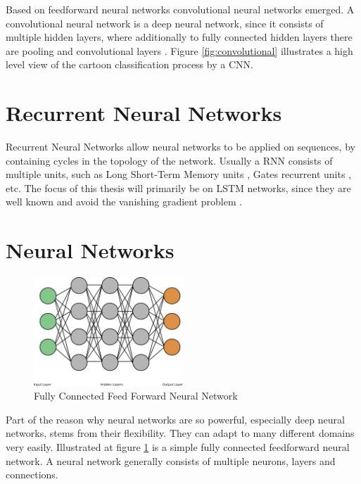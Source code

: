 \documentclass[draft,final,oneside]{vutinfth} %
\begin{document}
Based on feedforward neural networks convolutional neural networks emerged. A convolutional neural network is a deep neural network, since it consists of multiple hidden layers, where additionally to fully connected hidden layers there are pooling and convolutional layers \cite{Druzhkov2016}\cite{cnnnontech}. Figure \ref{fig:convolutional} illustrates a high level view of the cartoon classification process by a CNN.

\section{Recurrent Neural Networks}

Recurrent Neural Networks allow neural networks to be applied on sequences, by containing cycles in the topology of the network. Usually a RNN consists of multiple units, such as Long Short-Term Memory units \cite{hochreiter}, Gates recurrent units \cite{gru}, etc. The focus of this thesis will primarily be on LSTM networks, since they are well known and avoid the vanishing gradient problem \cite {vanishinggradient}.


\iffalse
\section{Neural Networks}

\begin{figure}[ht]
	\centering
  	\includegraphics[width=0.5\textwidth]{graphics/simple_neural_network.png}
	\caption{Fully Connected Feed Forward Neural Network}
	\label{fig:feedforward}
\end{figure}

Part of the reason why neural networks are so powerful, especially deep neural networks, stems from their flexibility. They can adapt to many different domains very easily. Illustrated at figure \ref{fig:feedforward} is a simple fully connected feedforward neural network. A neural network generally consists of multiple neurons, layers and connections. \\
\end{document}
